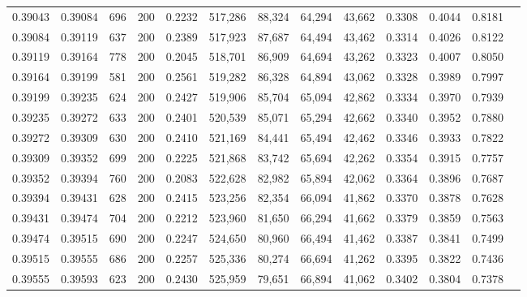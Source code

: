 \begin{tabular}{rrrrrrrrrrrrr}
0.39043 & 0.39084 &   696 & 200 &                                     0.2232 & 517,286 &  88,324 &  64,294 &  43,662 & 0.3308 & 0.4044 & 0.8181 \\
0.39084 & 0.39119 &   637 & 200 &                                     0.2389 & 517,923 &  87,687 &  64,494 &  43,462 & 0.3314 & 0.4026 & 0.8122 \\
0.39119 & 0.39164 &   778 & 200 &                                     0.2045 & 518,701 &  86,909 &  64,694 &  43,262 & 0.3323 & 0.4007 & 0.8050 \\
0.39164 & 0.39199 &   581 & 200 &                                     0.2561 & 519,282 &  86,328 &  64,894 &  43,062 & 0.3328 & 0.3989 & 0.7997 \\
0.39199 & 0.39235 &   624 & 200 &                                     0.2427 & 519,906 &  85,704 &  65,094 &  42,862 & 0.3334 & 0.3970 & 0.7939 \\
0.39235 & 0.39272 &   633 & 200 &                                     0.2401 & 520,539 &  85,071 &  65,294 &  42,662 & 0.3340 & 0.3952 & 0.7880 \\
0.39272 & 0.39309 &   630 & 200 &                                     0.2410 & 521,169 &  84,441 &  65,494 &  42,462 & 0.3346 & 0.3933 & 0.7822 \\
0.39309 & 0.39352 &   699 & 200 &                                     0.2225 & 521,868 &  83,742 &  65,694 &  42,262 & 0.3354 & 0.3915 & 0.7757 \\
0.39352 & 0.39394 &   760 & 200 &                                     0.2083 & 522,628 &  82,982 &  65,894 &  42,062 & 0.3364 & 0.3896 & 0.7687 \\
0.39394 & 0.39431 &   628 & 200 &                                     0.2415 & 523,256 &  82,354 &  66,094 &  41,862 & 0.3370 & 0.3878 & 0.7628 \\
0.39431 & 0.39474 &   704 & 200 &                                     0.2212 & 523,960 &  81,650 &  66,294 &  41,662 & 0.3379 & 0.3859 & 0.7563 \\
0.39474 & 0.39515 &   690 & 200 &                                     0.2247 & 524,650 &  80,960 &  66,494 &  41,462 & 0.3387 & 0.3841 & 0.7499 \\
0.39515 & 0.39555 &   686 & 200 &                                     0.2257 & 525,336 &  80,274 &  66,694 &  41,262 & 0.3395 & 0.3822 & 0.7436 \\
0.39555 & 0.39593 &   623 & 200 &                                     0.2430 & 525,959 &  79,651 &  66,894 &  41,062 & 0.3402 & 0.3804 & 0.7378 \\

\end{tabular}
